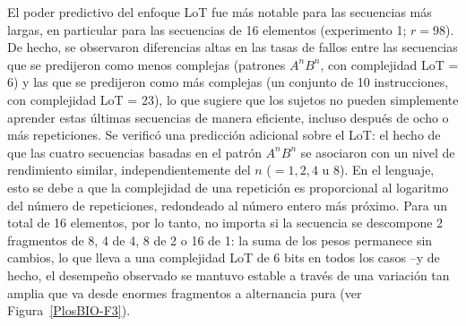 El poder predictivo del enfoque LoT fue más notable para las secuencias más largas, en particular para las secuencias de 16 elementos (experimento 1; $r = 98$). De hecho, se observaron diferencias altas en las tasas de fallos entre las secuencias que se predijeron como menos complejas (patrones $A^nB^n$, con complejidad LoT = 6) y las que se predijeron como más complejas (un conjunto de 10 instrucciones, con complejidad LoT = 23), lo que sugiere que los sujetos no pueden simplemente aprender estas últimas secuencias de manera eficiente, incluso después de ocho o más repeticiones. Se verificó una predicción adicional sobre el LoT: el hecho de que las cuatro secuencias basadas en el patrón $A^nB^n$ se asociaron con un nivel de rendimiento similar, independientemente del $n$ ($= 1, 2, 4$ u $8$). En el lenguaje, esto se debe a que la complejidad de una repetición es proporcional al logaritmo del número de repeticiones, redondeado al número entero más próximo. Para un total de 16 elementos, por lo tanto, no importa si la secuencia se descompone 2 fragmentos de 8, 4 de 4, 8 de 2 o 16 de 1: la suma de los pesos permanece sin cambios, lo que lleva a una complejidad LoT de 6 bits en todos los casos --y de hecho, el desempeño observado se mantuvo estable a través de una variación tan amplia que va desde enormes fragmentos a alternancia pura (ver Figura~\ref{PlosBIO-F3}).


